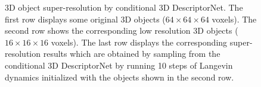 \documentclass[10pt,twocolumn,letterpaper]{article}
\begin{document}
\begin{figure}
		\caption{3D object super-resolution by conditional 3D DescriptorNet. The first row displays some original 3D objects ($64 \times 64 \times 64$ voxels). The second row shows the corresponding low resolution 3D objects ($16 \times 16 \times 16$ voxels). The last row displays the corresponding super-resolution results which are obtained by sampling from the conditional 3D DescriptorNet by running 10 steps of Langevin dynamics initialized with the objects shown in the second row.}	
	\label{exp:superResolution}
\end{figure}
\end{document}
